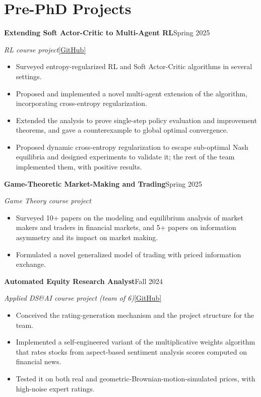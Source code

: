 \documentclass[11pt,letterpaper]{article}
\newcommand{\entry}[2]{\needspace{6\baselineskip}\textbf{#1}\hfill #2\par}
\newcommand{\sub}[2]{{\itshape #1}\hfill{#2}\par}
\newcommand{\gap}{\vspace{8pt}}
\begin{document}
\section*{Pre-PhD Projects}
\entry{Extending Soft Actor-Critic to Multi-Agent RL}{Spring 2025}
\sub{RL course project}{\href{https://github.com/IshaqHamza/Multi-agent-SAC}{[GitHub]}}
\begin{itemize}
  \item Surveyed entropy-regularized RL and Soft Actor-Critic algorithms in several settings.
  \item Proposed and implemented a novel multi-agent extension of the algorithm, incorporating
        cross-entropy regularization.
  \item Extended the analysis to prove single-step policy evaluation and improvement theorems, and gave a
        counterexample to global optimal convergence.
  \item Proposed dynamic cross-entropy regularization to escape sub-optimal Nash equilibria and designed
        experiments to validate it; the rest of the team implemented them, with positive results.
\end{itemize}

\gap
\entry{Game-Theoretic Market-Making and Trading}{Spring 2025}
\sub{Game Theory course project}{}
\begin{itemize}
  \item Surveyed 10+ papers on the modeling and equilibrium analysis of market makers and traders in
        financial markets, and 5+ papers on information asymmetry and its impact on market making.
  \item Formulated a novel generalized model of trading with priced information exchange.
\end{itemize}

\gap
\entry{Automated Equity Research Analyst}{Fall 2024}
\sub{Applied DS\&AI course project (team of 6)}{\href{https://github.com/Finance-Automation-Projects/finance-dashboard}{[GitHub]}}
\begin{itemize}
  \item Conceived the rating-generation mechanism and the project structure for the team.
  \item Implemented a self-engineered variant of the multiplicative weights algorithm that rates stocks from
        aspect-based sentiment analysis scores computed on financial news.
  \item Tested it on both real and geometric-Brownian-motion-simulated prices, with high-noise expert ratings.
\end{itemize}
\end{document}

